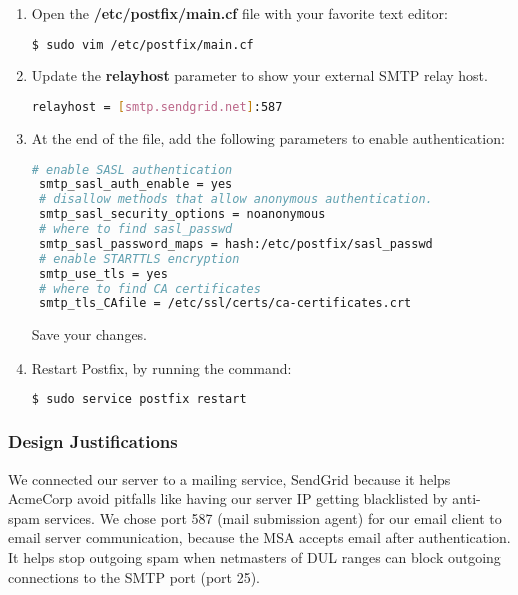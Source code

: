 \begin{enumerate}
 \item { Open the \textbf{/etc/postfix/main.cf} file with your favorite
		text editor:
  \begin{lstlisting}[language=bash]
 $ sudo vim /etc/postfix/main.cf 
   \end{lstlisting}
 }
 \item { Update the \textbf{relayhost} parameter to show your external SMTP
	 relay host.
  \begin{lstlisting}[language=bash]
  relayhost = [smtp.sendgrid.net]:587 
   \end{lstlisting}
 }
 \item {At the end of the file, add the following parameters to enable
	 authentication:
 \begin{lstlisting}[language=bash]
 # enable SASL authentication
 smtp_sasl_auth_enable = yes
 # disallow methods that allow anonymous authentication.
 smtp_sasl_security_options = noanonymous
 # where to find sasl_passwd
 smtp_sasl_password_maps = hash:/etc/postfix/sasl_passwd
 # enable STARTTLS encryption
 smtp_use_tls = yes
 # where to find CA certificates
 smtp_tls_CAfile = /etc/ssl/certs/ca-certificates.crt
 \end{lstlisting}
 Save your changes.
}
 \item { Restart Postfix, by running the command:
 \begin{lstlisting}[language=bash]
 $ sudo service postfix restart
 \end{lstlisting}
 }
\end{enumerate}

\subsubsection{Design Justifications}
We connected our server to a mailing service, SendGrid because it helps
AcmeCorp avoid pitfalls like having our server IP getting blacklisted by
anti-spam services. We chose port 587 (mail submission agent) for our email
client to email server communication, because the MSA accepts email after 
authentication. It helps stop outgoing spam when netmasters of DUL ranges can 
block outgoing connections to the SMTP port (port 25).
